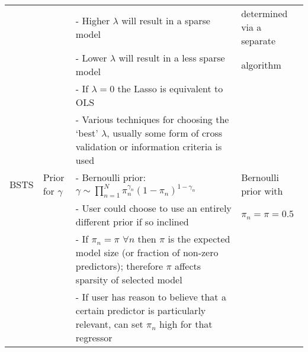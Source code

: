 \begin{landscape}
\begin{table}[]
\begin{tabular}{p{2cm} | p{3 cm}| p{11cm}| p{4cm}}
                   &                                                    & - Higher $\lambda$ will result in a sparse model                                                                                                                                     &   determined via a separate                                                   \\
                   &                                                    & - Lower $\lambda$ will result in a less sparse model                                                                                                                                          &     algorithm                                               \\
                   &                                                    & - If $\lambda = 0$ the Lasso is equivalent to OLS                                                                                                                                         &                                                    \\
                   &                                                    & - Various techniques for choosing the `best' $\lambda$, usually some form of cross validation or information criteria is used                                                                                                                   &                                                    \\
\hline
\hline
BSTS               & Prior for $\gamma$               & - Bernoulli prior: $\gamma \sim \prod_{n=1}^{N} \pi_{n}^{\gamma_{n}}(1-\pi_{n})^{1-\gamma_{n}}$                                                                                           & Bernoulli prior with                              \\
                   &                                                    & - User could choose to use an entirely different prior if so inclined                                                                                                                     &    $\pi_{n} = \pi = 0.5$                                                 \\
                   &                                                    & - If $\pi_{n} = \pi$ $\forall n$ then $\pi$ is the expected model size (or fraction of non-zero predictors); therefore $\pi$ affects sparsity of selected model                           &                                                    \\
                   &                                                    & - If user has reason to believe that a certain predictor is particularly relevant, can set $\pi_{n}$ high for that regressor                                                              &                                                    \\

\end{tabular}
\end{table}
\end{landscape}

